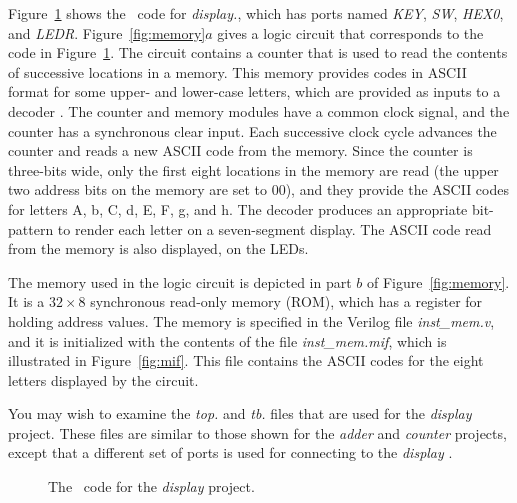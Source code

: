 {Figure~\ref{fig:display} shows the \hdlName~code for {\it display.\hdlFileExt}, which 
has ports named {\it KEY}, {\it SW}, {\it HEX0}, and {\it LEDR}.
Figure~\ref{fig:memory}$a$ gives a logic circuit that corresponds to the code in 
Figure~\ref{fig:display}. The circuit contains a counter that is used to read the 
contents of successive locations in a memory. This memory provides codes in ASCII format 
for some upper- and lower-case letters, which are provided as inputs to a decoder \hdlModuleName. 
The counter and memory modules have a common clock signal, and the counter has a
synchronous clear input. Each successive clock cycle advances the counter and reads 
a new ASCII code from the memory. Since the counter is three-bits wide, only the first 
eight locations in the memory are read (the upper two address bits on the memory are set
to 00), and they provide the ASCII codes for letters A, b, C, d, E, F, g, and h. The 
decoder produces an appropriate bit-pattern to render each letter on a seven-segment display.
The ASCII code read from the memory is also displayed, on the LEDs.

The memory used in the logic circuit is depicted in part $b$ of Figure~\ref{fig:memory}. It
is a $32 \times 8$ synchronous read-only memory (ROM), which has a register for holding 
address values. The memory is specified in the Verilog file {\it inst\_mem.v}, and it is 
initialized with the contents of the file {\it inst\_mem.mif},
which is illustrated in Figure~\ref{fig:mif}. This file contains the ASCII codes for the 
eight letters displayed by the circuit.

You may wish to examine the {\it top.\hdlFileExt} and {\it tb.\hdlFileExt} files that are 
used for the {\it display} project.  These files are similar to those shown for the 
{\it adder} and {\it counter} projects, except that a different set of ports is used for 
connecting to the {\it display} \hdlModuleName. 

\begin{figure}[h]
\begin{center}
\begin{minipage}[h]{15 cm}
	{}
	{}
\end{minipage}
	\caption{The \hdlName~code for the {\it display} project.}
	\label{fig:display}
\end{center}
\end{figure}

}
